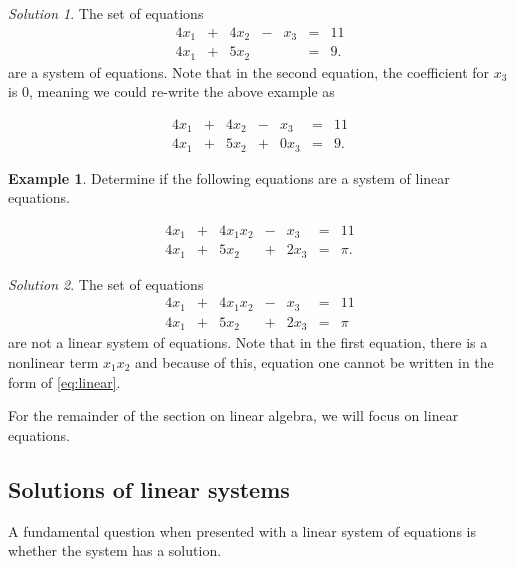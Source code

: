 \documentclass[
]{book}
\theoremstyle{definition}
\theoremstyle{definition}
\newtheorem{example}{Example}[chapter]
\theoremstyle{definition}
\theoremstyle{definition}
\theoremstyle{remark}
\newtheorem*{solution}{Solution}
\begin{document}
\begin{solution}
The set of equations
\begin{alignat*}{4}
x_1   & {}+{} & 4 x_2 & {}-{} & x_3 & {}={} & 11 \\
4 x_1 & {}+{} & 5 x_2 & {}{} &     & {}={} & 9.
\end{alignat*}
are a system of equations. Note that in the second equation, the coefficient for \(x_3\) is 0, meaning we could re-write the above example as

\begin{alignat*}{4}
x_1   & {}+{} & 4 x_2 & {}-{} & x_3 & {}={} & 11 \\
4 x_1 & {}+{} & 5 x_2 & {}+{} & 0 x_3 & {}={} & 9.
\end{alignat*}
\end{solution}

\begin{example}
Determine if the following equations are a system of linear equations.

\begin{alignat*}{4}
x_1   & {}+{} & 4 x_1 x_2 & {}-{} & x_3 & {}={} & 11 \\
4 x_1 & {}+{} & 5 x_2 & {}+{} & 2 x_3 & {}={} & \pi.
\end{alignat*}
\end{example}

\begin{solution}
The set of equations
\begin{alignat*}{4}
x_1   & {}+{} & 4 x_1 x_2 & {}-{} & x_3 & {}={} & 11 \\
4 x_1 & {}+{} & 5 x_2 & {}+{} & 2 x_3 & {}={} & \pi
\end{alignat*}
are not a linear system of equations. Note that in the first equation, there is a nonlinear term \(x_1 x_2\) and because of this, equation one cannot be written in the form of \eqref{eq:linear}.
\end{solution}

For the remainder of the section on linear algebra, we will focus on linear equations.

\hypertarget{solutions-of-linear-systems}{%
\subsection{Solutions of linear systems}\label{solutions-of-linear-systems}}

A fundamental question when presented with a linear system of equations is whether the system has a solution.
\end{document}
